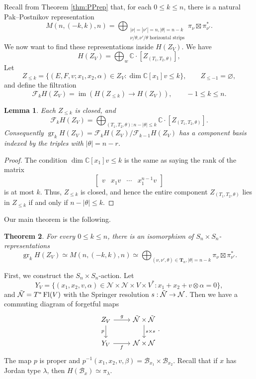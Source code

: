 \documentclass[12pt,a4paper]{article}
\def\Fl{\operatorname{Fl}}
\theoremstyle{plain}
\newtheorem{thm}{Theorem}[section]
\newtheorem{lemma}[thm]{Lemma}
\theoremstyle{definition}
\theoremstyle{remark}
\newcommand{\gr}{\operatorname{gr}}
\newcommand{\im}{\operatorname{im}}
\newcommand{\cB}{\mathcal{B}}
\newcommand{\cN}{\mathcal{N}}
\newcommand{\bfT}{\mathbf{T}}
\newcommand{\scrF}{\mathscr{F}}
\newcommand{\CC}{\mathbb{C}}
\begin{document}
    Recall from Theorem \ref{thm:PPrep} that, for each $0\leq k\leq n$, there is a natural Pak--Postnikov representation 
    \[
    M(n,(-k,k),n) = \bigoplus_{\substack{|\nu| = |\nu'| = n,|\theta| = n-k \\ \nu/\theta,\nu'/\theta\text{ horizontal strips}}} \pi_\nu \boxtimes \pi^*_{\nu'}.
    \]
    We now want to find these representations inside $H(Z_V)$. We have
    \[
    H(Z_V) = \bigoplus_w \CC\cdot[Z_{(T_1,T_2,\theta)}],
    \]
    Let
    \[
    Z_{\leq k}=\{(E,F,v;x_1,x_2,\alpha)\in Z_V:\dim \CC[x_1]v\leq k\},\qquad Z_{\le-1}=\varnothing,
    \]
    and define the filtration
    \[
    \scrF_k H(Z_V)=\im \left(H(Z_{\leq k}) \longrightarrow H(Z_V)\right), \qquad -1\leq k\leq n.
    \]
    \begin{lemma}
        Each $Z_{\leq k}$ is closed, and
        \[
        \scrF_k H(Z_V)=
        \bigoplus_{(T_1,T_2,\theta):n - |\theta| \leq k}
                     \CC\cdot[Z_{(T_1,T_2,\theta)}].
        \]
        Consequently $\gr_kH(Z_V)=
        \scrF_k H(Z_V)/\scrF_{k-1}H(Z_V)$ has a component basis indexed by the triples with $|\theta|=n-r$.
    \end{lemma}

    \begin{proof}
        The condition $\dim\CC[x_1]v \leq k$ is the same as saying the rank of the matrix
        \[
        \begin{bmatrix}
            v & x_1v & \cdots & x_1^{n-1}v
        \end{bmatrix}
        \]
        is at most $k$. Thus, $Z_{\leq k}$ is closed, and hence the entire component $Z_{(T_1,T_2,\theta)}$ lies in $Z_{\leq k}$ if and only if $n - |\theta| \leq k$.
    \end{proof}

    Our main theorem is the following.

    \begin{thm}\label{thm:gr-PP}
        For every $0\leq k\leq n$, there is an isomorphism of $S_n\times S_n$-representations
        \[
        \gr_k H(Z_V) \simeq M(n,(-k,k),n) \simeq \bigoplus_{(\nu,\nu',\theta)\in \bfT_n, |\theta| = n-k} \pi_\nu \boxtimes \pi^*_{\nu'}.
        \]
    \end{thm}

    First, we construct the $S_n\times S_n$-action. Let
    \[
    Y_V=\{(x_1,x_2,v,\alpha)\in\cN\times \cN\times V\times V^*: x_1+x_2+v\otimes\alpha = 0\},
    \]
    and $\Tilde{\cN} = T^*\Fl(V)$ with the Springer resolution $s:\Tilde{\cN} \rightarrow \cN$. Then we have a commuting diagram of forgetful maps
    \[\begin{tikzcd}
    	{Z_V} & {\Tilde{\mathcal{N}} \times \Tilde{\mathcal{N}}} \\
    	{Y_V} & {\mathcal{N} \times \mathcal{N}}
    	\arrow["g", from=1-1, to=1-2]
    	\arrow["p"', from=1-1, to=2-1]
    	\arrow["s\times s", from=1-2, to=2-2]
    	\arrow["f"', from=2-1, to=2-2]
    \end{tikzcd}.\]
    The map $p$ is proper and $p^{-1}(x_1,x_2,v,\beta)=\cB_{x_1}\times\cB_{x_2}$. Recall that if $x$ has Jordan type $\lambda$, then $H(\cB_x) \simeq \pi_\lambda$.
\end{document}
